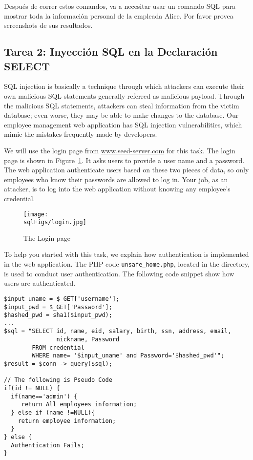Después de correr estos comandos, va a necesitar usar un comando SQL para mostrar toda la información personal de la empleada Alice. Por favor provea screenshots de sus resultados.

\subsection{Tarea 2: Inyección SQL en la Declaración SELECT} 


SQL injection is basically a technique through
which attackers can execute their own malicious SQL statements generally
referred as malicious payload. Through the malicious SQL statements, 
attackers can steal information from the victim database; even worse,
they may be able to make changes to the database. Our employee
management web application has SQL injection vulnerabilities, which mimic 
the mistakes frequently made by developers. 

We will use the login page from \url{www.seed-server.com}
for this task. The login page is shown in Figure~\ref{sql:fig:login}. 
It asks users to provide a user name and a password.
The web application authenticate users based on these two pieces 
of data, so only employees who know their 
passwords are allowed to log in.
Your job, as an attacker, is to log into the web application without knowing
any employee's credential. 


\begin{figure}[htb]
\begin{center}
\texttt{[image: \\sqlFigs/login.jpg]}
\end{center}
\caption{The Login page}
\label{sql:fig:login}
\end{figure}
 

To help you started with this task, we explain how authentication
is implemented in the web application. The PHP code 
\texttt{unsafe\_home.php}, located in the  directory, 
is used to conduct user authentication.
The following code snippet show how users are authenticated. 

\begin{lstlisting}
$input_uname = $_GET['username'];
$input_pwd = $_GET['Password'];
$hashed_pwd = sha1($input_pwd);
...
$sql = "SELECT id, name, eid, salary, birth, ssn, address, email, 
               nickname, Password
        FROM credential
        WHERE name= '$input_uname' and Password='$hashed_pwd'";
$result = $conn -> query($sql);

// The following is Pseudo Code 
if(id != NULL) {
  if(name=='admin') {
     return All employees information;
  } else if (name !=NULL){
    return employee information;
  }
} else {
  Authentication Fails;
}
\end{lstlisting}

